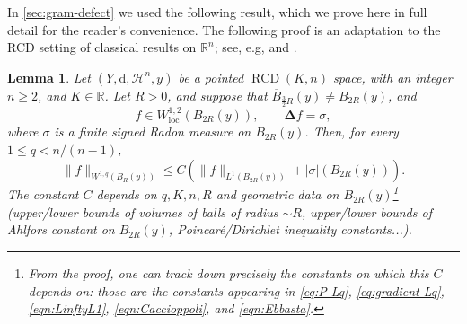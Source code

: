 \documentclass[12pt,a4paper,reqno]{amsart}
\newtheorem{lemma}[theorem]{Lemma}
\renewcommand{\leq}{\leqslant}
\renewcommand{\geq}{\geqslant}
\begin{document}
In \cref{sec:gram-defect} we used the following result, which we prove here in full detail for the reader's convenience. The following proof is an adaptation to the RCD setting of classical results on $\mathbb R^n$; see, e.g, \cite[Theorem 9.1]{Stampacchia} and \cite[Proposition 4.1 and Section 4.2]{Ponce}.
\begin{lemma}\label{lem:measure-data-rigorous}
Let $(Y,\mathrm{d},\mathcal{H}^n,y)$ be a pointed
$\operatorname{RCD}(K,n)$ space, with an integer $n\geq 2$, and $K\in\mathbb R$. Let $R>0$, and suppose that $\overline{B}_{\frac{3}{2}R}(y)\neq B_{2R}(y)$, and
\[
 f\in W^{1,2}_{\mathrm{loc}}(B_{2R}(y)),\qquad
 \mathbf{\Delta} f=\sigma,
\]
where $\sigma$ is a finite signed Radon measure on $B_{2R}(y)$.  Then,
for every $1\leq q<n/(n-1)$,
\begin{equation}\label{eq:measure-data-estimate}
 \|f\|_{W^{1,q}(B_R(y))}
 \leq C\left(\|f\|_{L^1(B_{2R}(y))}+|\sigma|(B_{2R}(y))\right).
\end{equation}
The constant $C$ depends on $q,K,n,R$ and geometric data on $B_{2R}(y)$\footnote{From the proof, one can track down precisely the constants on which this $C$ depends on: those are the constants appearing in \eqref{eq:P-Lq}, \eqref{eq:gradient-Lq}, \eqref{eqn:LinftyL1}, \eqref{eqn:Caccioppoli}, and \eqref{eqn:Ebbasta}.} (upper/lower bounds of volumes of balls of radius $\sim R$, upper/lower bounds of Ahlfors constant on $B_{2R}(y)$, Poincaré/Dirichlet inequality constants...).
\end{lemma}
\end{document}
